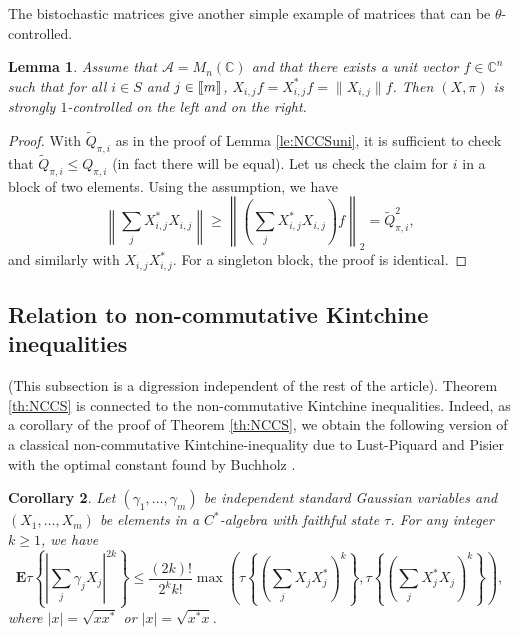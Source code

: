 \documentclass[11pt]{article}
\newtheorem{lemma}{Lemma}[section]
\newtheorem{corollary}[lemma]{Corollary}
\newcommand{\cA}{\mathcal{A}}
\newcommand{\dE}{\mathbf {E}}
\newcommand{\dC}{\mathbb {C}}
\newcommand{\ABS}[1]{{{\left| #1 \right|}}} %
\newcommand{\BRA}[1]{{{\left\{#1\right\}}}}
\newcommand{\NRM}[1]{{{\left\| #1\right\|}}} %
\newcommand{\PAR}[1]{{{\left(#1\right)}}} %
\newcommand{\1}{1\!\!{\sf I}}
\newcommand{\INT}[1]{{{\left[\hspace{-1.4pt}\left[#1\right]\hspace{-1.4pt}\right]}}}
\begin{document}
The bistochastic matrices give another simple example of matrices that can be $\theta$-controlled.

\begin{lemma}
\label{le:discr4}
Assume that $\cA = M_n(\dC)$ and that there exists  a unit vector $f \in \dC^n$ such that for all $i \in S$ and $j \in \INT{m}$,  $X_{i,j} f = X_{i,j}^* f = \| X_{i,j} \| f$.  Then $(X,\pi)$ is strongly $1$-controlled on the left and on the right.
\end{lemma} 

\begin{proof}
With $\tilde Q_{\pi,i}$ as in the proof of Lemma  \ref{le:NCCSuni}, it is sufficient to check that $\tilde Q_{\pi,i} \leq Q_{\pi,i}$ (in fact there will be equal). Let us check the claim for $i$ in a block of two elements. Using the assumption, we have 
$$
\NRM{ \sum_j X_{i,j}^* X_{i,j} } \geq \NRM{ \PAR{ \sum_j X_{i,j}^* X_{i,j} } f }_2 = \tilde Q^2_{\pi,i},$$
and similarly with $X_{i,j} X_{i,j}^*$.
For a singleton block, the proof is identical.\end{proof}

\subsection{Relation to non-commutative Kintchine inequalities}

(This subsection is a digression independent of the rest of the article). Theorem \ref{th:NCCS} is connected to the non-commutative Kintchine inequalities.  Indeed, as a corollary of the proof of Theorem \ref{th:NCCS}, we obtain the following version of a classical non-commutative Kintchine-inequality due to Lust-Piquard and Pisier \cite{MR1150376} with the optimal constant found by Buchholz \cite{MR1812816}. 

\begin{corollary}
Let $(\gamma_1,\ldots,\gamma_m)$ be independent standard Gaussian variables and $(X_1,\ldots,X_m)$ be  elements in a $C^*$-algebra with faithful   state $\tau$. For any integer $k \geq 1$, we have
$$
\dE \tau \BRA{ \ABS{ \sum_j \gamma_j X_j } ^{2k}} \leq  \frac{(2k)! }{ 2^k k!}    \max\PAR{  \tau \BRA{ \PAR{ \sum_j X_j X_j^* }^k}, \tau \BRA{ \PAR{\sum_j X_j^*X_j }^k}},
$$
where $|x| = \sqrt{ x x^*}$ or $|x| = \sqrt{x^*x}$.
\end{corollary}
\end{document}
